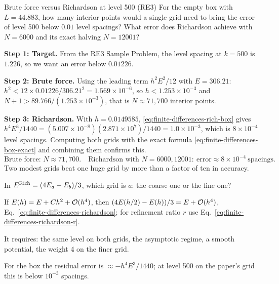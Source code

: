 \begin{sample}{Brute force versus Richardson at level 500 (RE3)}
For the empty box with $L=44.883$, how many interior points would a single grid need to bring the error of level 500 below $0.01$ level spacings? What error does Richardson achieve with $N=6000$ and its exact halving $N=12001$?

\textbf{Step 1: Target.} From the RE3 Sample Problem, the level spacing at $k=500$ is $1.226$, so we want an error below $0.01226$.

\textbf{Step 2: Brute force.} Using the leading term $h^2E^2/12$ with $E=306.21$: $h^2<12\times0.01226/306.21^2=1.569\times10^{-6}$, so $h<1.253\times10^{-3}$ and $N+1>89.766/(1.253\times10^{-3})$, that is $N\approx71{,}700$ interior points.

\textbf{Step 3: Richardson.} With $h=0.0149585$, \eqref{eq:finite-differences-rich-box} gives $h^4E^3/1440=(5.007\times10^{-8})(2.871\times10^{7})/1440=1.0\times10^{-3}$, which is $8\times10^{-4}$ level spacings. Computing both grids with the exact formula \eqref{eq:finite-differences-box-exact} and combining them confirms this.
\begin{equation*}
\boxed{\text{Brute force: }N\approx71{,}700.\quad\text{Richardson with }N=6000,12001:\ \text{error}\approx8\times10^{-4}\ \text{spacings}.}
\end{equation*}
Two modest grids beat one huge grid by more than a factor of ten in accuracy.
\end{sample}

\begin{checkpoint}
In $E^{\rm Rich}=(4E_a-E_b)/3$, which grid is $a$: the coarse one or the fine one?
\end{checkpoint}

\begin{keyideas}
\item If $E(h)=E+Ch^2+\mathcal{O}(h^4)$, then $(4E(h/2)-E(h))/3=E+\mathcal{O}(h^4)$, Eq.~\eqref{eq:finite-differences-richardson}; for refinement ratio $r$ use Eq.~\eqref{eq:finite-differences-richardson-r}.
\item It requires: the same level on both grids, the asymptotic regime, a smooth potential, the weight 4 on the finer grid.
\item For the box the residual error is $\approx-h^4E^3/1440$; at level 500 on the paper's grid this is below $10^{-3}$ spacings.
\end{keyideas}

